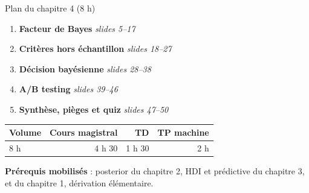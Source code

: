\begin{frame}{Plan du chapitre 4 (8 h)}
\begin{enumerate}
  \item[4.1] \textbf{Facteur de Bayes} \hfill \textit{slides 5--17}
  \item[4.2] \textbf{Critères hors échantillon} \hfill \textit{slides 18--27}
  \item[4.3] \textbf{Décision bayésienne} \hfill \textit{slides 28--38}
  \item[4.4] \textbf{A/B testing} \hfill \textit{slides 39--46}
  \item[4.5] \textbf{Synthèse, pièges et quiz} \hfill \textit{slides 47--50}
\end{enumerate}
\vspace{2mm}
\begin{tabular}{@{}lrrr@{}}
\toprule
\textbf{Volume} & \textbf{Cours magistral} & \textbf{TD} & \textbf{TP machine} \\
\midrule
8 h & 4 h 30 & 1 h 30 & 2 h \\
\bottomrule
\end{tabular}
\vspace{2mm}
\begin{tcolorbox}[colback=byPurple!6,colframe=byPurple,arc=2mm,width=.95\textwidth]
\small\centering
\textbf{Prérequis mobilisés} : posterior du chapitre 2, HDI et prédictive du chapitre 3,
 et  du chapitre 1, dérivation élémentaire.
\end{tcolorbox}
\end{frame}

